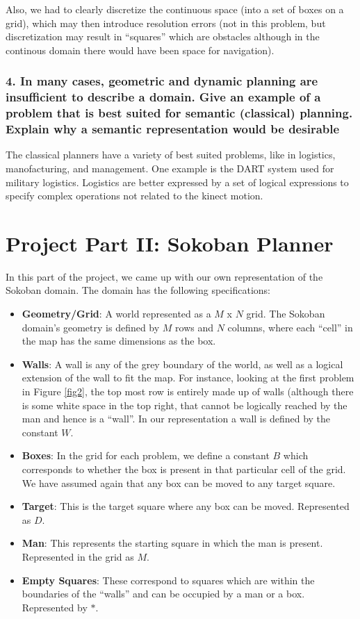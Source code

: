 \documentclass[10pt, letter]{article}
\begin{document}
Also, we had to clearly discretize the continuous space (into a set of boxes on a grid), which may then introduce resolution errors (not in this problem, but discretization may result in ``squares'' which are obstacles although in the continous domain there would have been space for navigation). 

\subsubsection*{4. In many cases, geometric and dynamic planning are insufficient to describe a domain. Give
an example of a problem that is best suited for semantic (classical) planning. Explain why a
semantic representation would be desirable}

The classical planners have a variety of best suited problems, like in logistics, manofacturing, and management. One example is the DART system used for military logistics. Logistics are better expressed by a set of logical expressions to specify complex operations not related to the kinect motion.


\section{Project Part II: Sokoban Planner}
In this part of the project, we came up with our own representation of the Sokoban domain. The domain has the following specifications:
\begin{itemize}
	\item \textbf{Geometry/Grid}: A world represented as a $M$ x $N$ grid. The Sokoban domain's geometry is defined by $M$ rows and $N$ columns, where each ``cell'' in the map has the same dimensions as the box.
	\item \textbf{Walls}: A wall is any of the grey boundary of the world, as well as a logical extension of the wall to fit the map. For instance, looking at the first problem in Figure \ref{fig2}, the top most row is entirely made up of walls (although there is some white space in the top right, that cannot be logically reached by the man and hence is a ``wall''. In our representation a wall is defined by the constant $W$.
	\item \textbf{Boxes}: In the grid for each problem, we define a constant $B$ which corresponds to whether the box is present in that particular cell of the grid. We have assumed again that any box can be moved to any target square.
	\item \textbf{Target}: This is the target square where any box can be moved. Represented as $D$.
	\item \textbf{Man}: This represents the starting square in which the man is present. Represented in the grid as $M$.
	\item \textbf{Empty Squares}: These correspond to squares which are within the boundaries of the ``walls'' and can be occupied by a man or a box. Represented by $*$.
\end{itemize}
\end{document}
